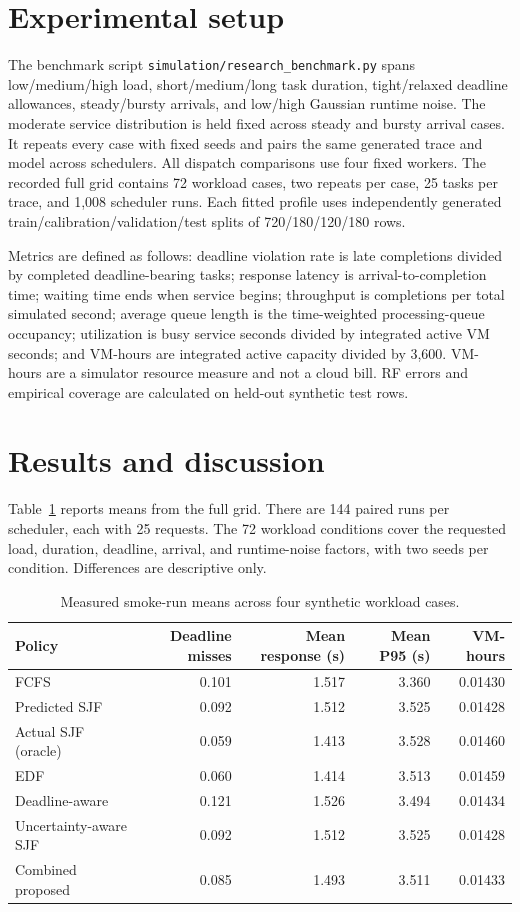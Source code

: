 \documentclass[11pt]{article}
\begin{document}
\section{Experimental setup}
The benchmark script \verb|simulation/research_benchmark.py| spans low/medium/high load, short/medium/long task duration, tight/relaxed deadline allowances, steady/bursty arrivals, and low/high Gaussian runtime noise. The moderate service distribution is held fixed across steady and bursty arrival cases. It repeats every case with fixed seeds and pairs the same generated trace and model across schedulers. All dispatch comparisons use four fixed workers. The recorded full grid contains 72 workload cases, two repeats per case, 25 tasks per trace, and 1,008 scheduler runs. Each fitted profile uses independently generated train/calibration/validation/test splits of 720/180/120/180 rows.

Metrics are defined as follows: deadline violation rate is late completions divided by completed deadline-bearing tasks; response latency is arrival-to-completion time; waiting time ends when service begins; throughput is completions per total simulated second; average queue length is the time-weighted processing-queue occupancy; utilization is busy service seconds divided by integrated active VM seconds; and VM-hours are integrated active capacity divided by 3,600. VM-hours are a simulator resource measure and not a cloud bill. RF errors and empirical coverage are calculated on held-out synthetic test rows.

\section{Results and discussion}
Table~\ref{tab:results} reports means from the full grid. There are 144 paired runs per scheduler, each with 25 requests. The 72 workload conditions cover the requested load, duration, deadline, arrival, and runtime-noise factors, with two seeds per condition. Differences are descriptive only.
\begin{table}[h]
\centering
\caption{Measured smoke-run means across four synthetic workload cases.}
\label{tab:results}
\begin{tabular}{lrrrr}
\toprule
Policy & Deadline misses & Mean response (s) & Mean P95 (s) & VM-hours\\
\midrule
FCFS & 0.101 & 1.517 & 3.360 & 0.01430\\
Predicted SJF & 0.092 & 1.512 & 3.525 & 0.01428\\
Actual SJF (oracle) & 0.059 & 1.413 & 3.528 & 0.01460\\
EDF & 0.060 & 1.414 & 3.513 & 0.01459\\
Deadline-aware & 0.121 & 1.526 & 3.494 & 0.01434\\
Uncertainty-aware SJF & 0.092 & 1.512 & 3.525 & 0.01428\\
Combined proposed & 0.085 & 1.493 & 3.511 & 0.01433\\
\bottomrule
\end{tabular}
\end{table}
\end{document}
